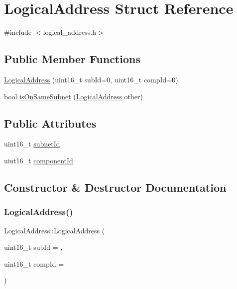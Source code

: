 \hypertarget{structLogicalAddress}{}\section{Logical\+Address Struct Reference}
\label{structLogicalAddress}


{\ttfamily \#include $<$logical\+\_\+address.\+h$>$}

\subsection*{Public Member Functions}
\begin{DoxyCompactItemize}
\item 
\hyperlink{structLogicalAddress_a5ca025d24b9b8e2925814d3fc6607bd4}{Logical\+Address} (uint16\+\_\+t sub\+Id=0, uint16\+\_\+t comp\+Id=0)
\item 
bool \hyperlink{structLogicalAddress_a9a8483eda7a165e0413a5b7334e47fc8}{is\+On\+Same\+Subnet} (\hyperlink{structLogicalAddress}{Logical\+Address} other)
\end{DoxyCompactItemize}
\subsection*{Public Attributes}
\begin{DoxyCompactItemize}
\item 
uint16\+\_\+t \hyperlink{structLogicalAddress_a2ea7e86b6587adbfe03b16c7e0f0fe3b}{subnet\+Id}
\item 
uint16\+\_\+t \hyperlink{structLogicalAddress_ac4f97357841656cd45f3183630b7af45}{component\+Id}
\end{DoxyCompactItemize}


\subsection{Constructor \& Destructor Documentation}
\mbox{\label{structLogicalAddress_a5ca025d24b9b8e2925814d3fc6607bd4}} 
\subsubsection{\texorpdfstring{Logical\+Address()}{LogicalAddress()}}
{\footnotesize\ttfamily Logical\+Address\+::\+Logical\+Address (\begin{DoxyParamCaption}\item[{uint16\+\_\+t}]{sub\+Id = {},  }\item[{uint16\+\_\+t}]{comp\+Id = {} }\end{DoxyParamCaption})\hspace{0.3cm}{\ttfamily [inline]}}



